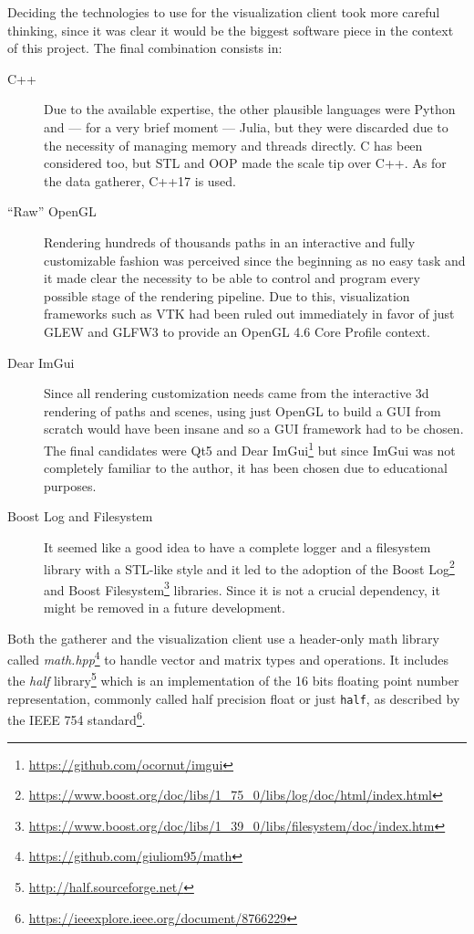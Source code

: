 Deciding the technologies to use for the visualization client took more careful thinking, since it was clear it would be the biggest software piece in the context of this project. The final combination consists in:
\begin{description}
	\item[C++] Due to the available expertise, the other plausible languages were Python and --- for a very brief moment --- Julia, but they were discarded due to the necessity of managing memory and threads directly. C has been considered too, but STL and OOP made the scale tip over C++. As for the data gatherer, C++17 is used.
	\item[“Raw” OpenGL] Rendering hundreds of thousands paths in an interactive and fully customizable fashion was perceived since the beginning as no easy task and it made clear the necessity to be able to control and program every possible stage of the rendering pipeline. Due to this, visualization frameworks such as VTK \cite{vtk2006} had been ruled out immediately in favor of just GLEW and GLFW3 to provide an OpenGL 4.6 Core Profile context.
	\item[Dear ImGui] Since all rendering customization needs came from the interactive 3d rendering of paths and scenes, using just OpenGL to build a GUI from scratch would have been insane and so a GUI framework had to be chosen. The final candidates were Qt5 and Dear ImGui\footnote{\url{https://github.com/ocornut/imgui}} but since ImGui was not completely familiar to the author, it has been chosen due to educational purposes.
	\item[Boost Log and Filesystem] It seemed like a good idea to have a complete logger and a filesystem library with a STL-like style and it led to the adoption of the Boost Log\footnote{\url{https://www.boost.org/doc/libs/1_75_0/libs/log/doc/html/index.html}} and Boost Filesystem\footnote{\url{https://www.boost.org/doc/libs/1_39_0/libs/filesystem/doc/index.htm}} libraries. Since it is not a crucial dependency, it might be removed in a future development.
\end{description}

Both the gatherer and the visualization client use a header-only math library called \textit{math.hpp}\footnote{\url{https://github.com/giuliom95/math}} to handle vector and matrix types and operations. It includes the \textit{half} library\footnote{\url{http://half.sourceforge.net/}} which is an implementation of the 16 bits floating point number representation, commonly called half precision float or just \texttt{half}, as described by the IEEE 754 standard\footnote{\url{https://ieeexplore.ieee.org/document/8766229}}.

